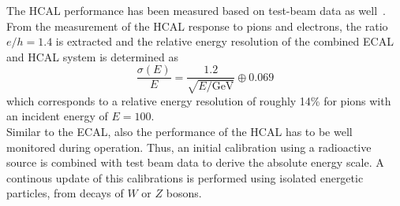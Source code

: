 The HCAL performance has been measured based on test-beam data as well~\cite{Abramov:2000vd, springerlink:10.1140/epjc/s10052-009-0959-5}. From the measurement of the HCAL response to pions and electrons, the ratio $e/h = 1.4$ is extracted and the relative energy resolution of the combined ECAL and HCAL system is determined as
\begin{equation}
\frac{\sigma(E)}{E}= \frac{1.2}{\sqrt{E/\mathrm{GeV}}} \oplus 0.069  
\end{equation}
which corresponds to a relative energy resolution of roughly 14\% for pions with an incident energy of $E = 100$\gev. \\
Similar to the ECAL, also the performance of the HCAL has to be well monitored during operation. Thus, an initial calibration using a radioactive source is combined with test beam data to derive the absolute energy scale. A continous update of this calibrations is performed using isolated energetic particles, \eg from decays of $W$ or $Z$ bosons. 

